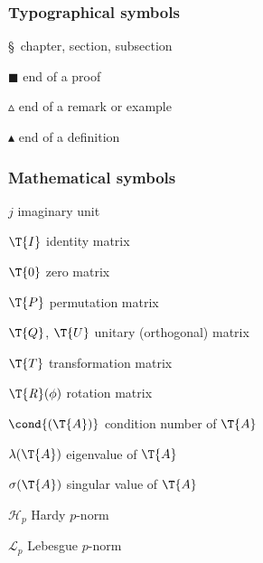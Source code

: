 \subsubsection*{Typographical symbols}
\S\ chapter, section, subsection

$\blacksquare$ end of a proof

$\vartriangle$ end of a remark or example

$\blacktriangle$ end of a definition

\subsubsection*{Mathematical symbols}

$j$ imaginary unit

$\T{I}$ identity matrix

$\T{0}$ zero matrix

$\T{P}$ permutation matrix

$\T{Q}$, $\T{U}$ unitary (orthogonal) matrix

$\T{T}$ transformation matrix

$\T{\mathit{R}}(\phi)$ rotation matrix

$\cond{(\T{A})}$ condition number of $\T{A}$

$\lambda(\T{A})$ eigenvalue of $\T{A}$

$\sigma(\T{A})$ singular value of $\T{A}$

$\mathscr{H}_p$ Hardy $p$-norm

$\mathscr{L}_p$ Lebesgue $p$-norm

\section{\nameCaAcronyms}
\label{sc:abbreviationsAndAcronyms}
\printacronyms[name={}, heading=none]
